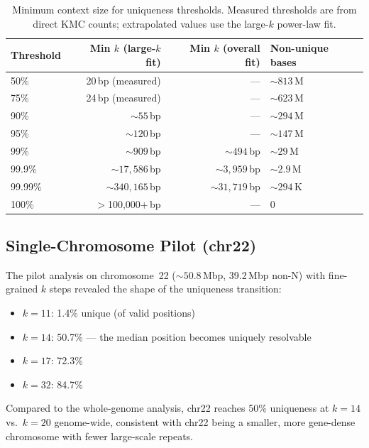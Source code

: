 \documentclass[11pt,a4paper]{article}
\begin{document}
\begin{table}[H]
\centering
\caption{Minimum context size for uniqueness thresholds. Measured thresholds are from direct KMC counts; extrapolated values use the large-$k$ power-law fit.}
\begin{tabular}{lrrl}
\toprule
\textbf{Threshold} & \textbf{Min $k$ (large-$k$ fit)} & \textbf{Min $k$ (overall fit)} & \textbf{Non-unique bases} \\
\midrule
50\%    & 20\,bp (measured)    & ---         & ${\sim}813$\,M \\
75\%    & 24\,bp (measured)    & ---         & ${\sim}623$\,M \\
90\%    & ${\sim}55$\,bp       & ---         & ${\sim}294$\,M \\
95\%    & ${\sim}120$\,bp      & ---         & ${\sim}147$\,M \\
99\%    & ${\sim}909$\,bp      & ${\sim}494$\,bp    & ${\sim}29$\,M \\
99.9\%  & ${\sim}17{,}586$\,bp & ${\sim}3{,}959$\,bp & ${\sim}2.9$\,M \\
99.99\% & ${\sim}340{,}165$\,bp & ${\sim}31{,}719$\,bp & ${\sim}294$\,K \\
100\%   & $>$100,000+\,bp      & ---         & 0 \\
\bottomrule
\end{tabular}
\label{tab:thresholds}
\end{table}

\subsection{Single-Chromosome Pilot (chr22)}

The pilot analysis on chromosome~22 (${\sim}50.8$\,Mbp, 39.2\,Mbp non-N) with fine-grained $k$ steps revealed the shape of the uniqueness transition:

\begin{itemize}
    \item $k=11$: 1.4\% unique (of valid positions)
    \item $k=14$: 50.7\% --- the median position becomes uniquely resolvable
    \item $k=17$: 72.3\%
    \item $k=32$: 84.7\%
\end{itemize}

Compared to the whole-genome analysis, chr22 reaches 50\% uniqueness at $k=14$ vs.\ $k=20$ genome-wide, consistent with chr22 being a smaller, more gene-dense chromosome with fewer large-scale repeats.
\end{document}
